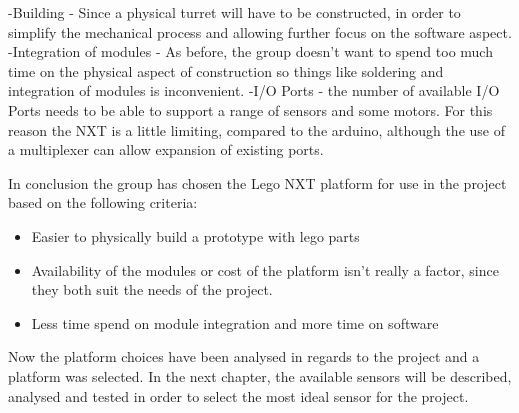 -Building - Since a physical turret will have to be constructed, in order to simplify the mechanical process and allowing further focus on the software aspect.\nl
-Integration of modules - As before, the group doesn't want to spend too much time on the physical aspect of construction so things like soldering and integration of modules
is inconvenient.\nl
-I/O Ports - the number of available I/O Ports needs to be able to support a range of sensors and some motors. For this reason the NXT is a little limiting,
compared to the arduino, although the use of a multiplexer can allow expansion of existing ports.

In conclusion the group has chosen the Lego NXT platform for use in the project based on the following criteria:
\begin{itemize}
  \item Easier to physically build a prototype with lego parts
  \item Availability of the modules or cost of the platform isn't really a factor, since they both suit the needs of the project.
  \item Less time spend on module integration and more time on software
\end{itemize}

Now the platform choices have been analysed in regards to the project and a platform was selected. In the next chapter,
the available sensors will be described, analysed and tested in order to select the most ideal sensor for the project.

